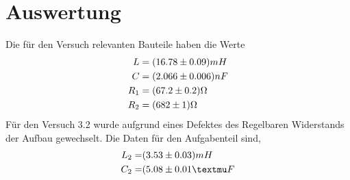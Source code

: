 \section{Auswertung}
\label{sec:Auswertung}
Die für den Versuch relevanten Bauteile haben die Werte
\begin{eqnarray}
  L 	&= (\num{16.78 +- 0.09}) mH	\\
  C 	&= (\num{2.066 +- 0.006}) nF	\\
R_1 	&= (\num{67.2 +- 0.2}) \Omega	\\
R_2 	&= (\num{682 +- 1}) \Omega
  \label{eqn:Bau}
\end{eqnarray}
Für den Versuch 3.2 wurde aufgrund eines Defektes des Regelbaren Widerstands der Aufbau gewechselt. Die Daten für den Aufgabenteil sind,\begin{eqnarray}
  L_2 =& (\num{3.53 +- 0.03}) mH	\\
  C_2 =& (\num{5.08 +- 0.01} µF		
\end{eqnarray}
